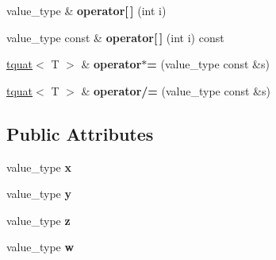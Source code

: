 \begin{DoxyCompactItemize}
\item 
\hypertarget{structglm_1_1detail_1_1tquat_a5d1e6b060936b49027498e6d53c76376}{value\-\_\-type \& {\bfseries operator\mbox{[}$\,$\mbox{]}} (int i)}\label{structglm_1_1detail_1_1tquat_a5d1e6b060936b49027498e6d53c76376}

\item 
\hypertarget{structglm_1_1detail_1_1tquat_a6c3cfd12f4181c6a333ef9f9e34b17cb}{value\-\_\-type const \& {\bfseries operator\mbox{[}$\,$\mbox{]}} (int i) const }\label{structglm_1_1detail_1_1tquat_a6c3cfd12f4181c6a333ef9f9e34b17cb}

\item 
\hypertarget{structglm_1_1detail_1_1tquat_af11533bae22ffefb3e2c676d2dafec39}{\hyperlink{structglm_1_1detail_1_1tquat}{tquat}$<$ T $>$ \& {\bfseries operator$\ast$=} (value\-\_\-type const \&s)}\label{structglm_1_1detail_1_1tquat_af11533bae22ffefb3e2c676d2dafec39}

\item 
\hypertarget{structglm_1_1detail_1_1tquat_a1c5c04b2dd3b4a7e320b92ff19e0a1de}{\hyperlink{structglm_1_1detail_1_1tquat}{tquat}$<$ T $>$ \& {\bfseries operator/=} (value\-\_\-type const \&s)}\label{structglm_1_1detail_1_1tquat_a1c5c04b2dd3b4a7e320b92ff19e0a1de}

\end{DoxyCompactItemize}
\subsection*{Public Attributes}
\begin{DoxyCompactItemize}
\item 
\hypertarget{structglm_1_1detail_1_1tquat_a7f897684c4c180018a4f01ceaa4f775a}{value\-\_\-type {\bfseries x}}\label{structglm_1_1detail_1_1tquat_a7f897684c4c180018a4f01ceaa4f775a}

\item 
\hypertarget{structglm_1_1detail_1_1tquat_aa79431da9a3822fee4155a4b080c1d0a}{value\-\_\-type {\bfseries y}}\label{structglm_1_1detail_1_1tquat_aa79431da9a3822fee4155a4b080c1d0a}

\item 
\hypertarget{structglm_1_1detail_1_1tquat_aaeb15cd65ede32625a579699798cf77c}{value\-\_\-type {\bfseries z}}\label{structglm_1_1detail_1_1tquat_aaeb15cd65ede32625a579699798cf77c}

\item 
\hypertarget{structglm_1_1detail_1_1tquat_abe11665751ce8cbeae672b187a95e570}{value\-\_\-type {\bfseries w}}\label{structglm_1_1detail_1_1tquat_abe11665751ce8cbeae672b187a95e570}

\end{DoxyCompactItemize}


